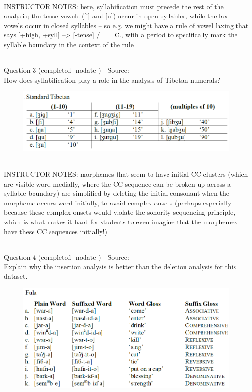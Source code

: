 \documentclass[12pt]{article}
\begin{document}
~\\
INSTRUCTOR NOTES: here, syllabification must precede the rest of the analysis; the tense vowels ([i] and [u]) occur in open syllables, while the lax vowels occur in closed syllables -- so e.g. we might have a rule of vowel laxing that says [+high, +syll] --> [-tense] / \_\_ C., with a period to specifically mark the syllable boundary in the context of the rule


~\\

{\large Question 3} (completed -nodate-) - Source: \\

How does syllabification play a role in the analysis of Tibetan numerals?\\

\begin{figure}[H]
\includegraphics{../images/tibetan.png}
\end{figure}

~\\
INSTRUCTOR NOTES: morphemes that seem to have initial CC clusters (which are visible word-medially, where the CC sequence can be broken up across a syllable boundary) are simplified by deleting the initial consonant when the morpheme occurs word-initially, to avoid complex onsets (perhaps especially because these complex onsets would violate the sonority sequencing principle, which is what makes it hard for students to even imagine that the morphemes have these CC sequences initially!)


~\\

{\large Question 4} (completed -nodate-) - Source: \\

Explain why the insertion analysis is better than the deletion analysis for this dataset.\\

\begin{figure}[H]
\includegraphics{../images/fula.png}
\end{figure}
\end{document}
